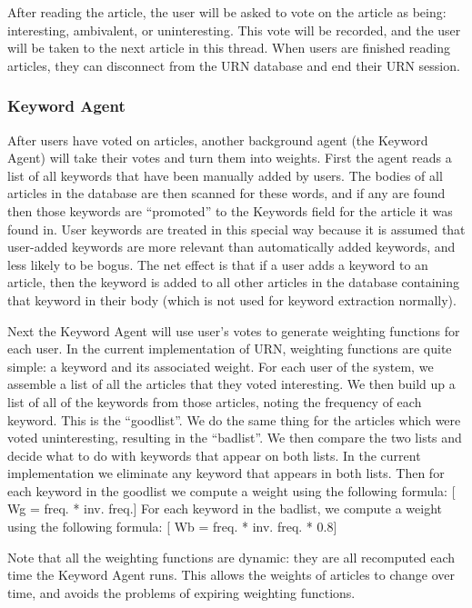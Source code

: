 After reading the article, the user will be asked to vote on the article as
being: interesting, ambivalent, or uninteresting. This vote will be recorded,
and the user will be taken to the next article in this thread. When users are
finished reading articles, they can disconnect from the URN database and end
their URN session.

\subsubsection{Keyword Agent}

After users have voted on articles, another background agent (the Keyword
Agent) will take their votes and turn them into weights. First the agent reads
a list of all keywords that have been manually added by users. The bodies of
all articles in the database are then scanned for these words, and if any are
found then those keywords are ``promoted'' to the Keywords field for the
article it was found in. User keywords are treated in this special way because
it is assumed that user-added keywords are more relevant than automatically
added keywords, and less likely to be bogus. The net effect is that if a user
adds a keyword to an article, then the keyword is added to all other articles
in the database containing that keyword in their body (which is not used for
keyword extraction normally).

Next the Keyword Agent will use user's votes to generate weighting functions
for each user. In the current implementation of URN, weighting functions are
quite simple: a keyword and its associated weight. For each user of the system,
we assemble a list of all the articles that they voted interesting. We then
build up a list of all of the keywords from those articles, noting the
frequency of each keyword. This is the ``goodlist''. We do the same thing for
the articles which were voted uninteresting, resulting in the ``badlist''. We
then compare the two lists and decide what to do with keywords that appear on
both lists. In the current implementation we eliminate any keyword that appears
in both lists. Then for each keyword in the goodlist we compute a weight using
the following formula:
[ Wg = freq. * inv. freq.]
For each keyword in the badlist, we compute a weight using the following
formula:
[ Wb = freq. * inv. freq. * 0.8]

Note that all the weighting functions are dynamic: they are all recomputed each
time the Keyword Agent runs. This allows the weights of articles to change over
time, and avoids the problems of expiring weighting functions.

